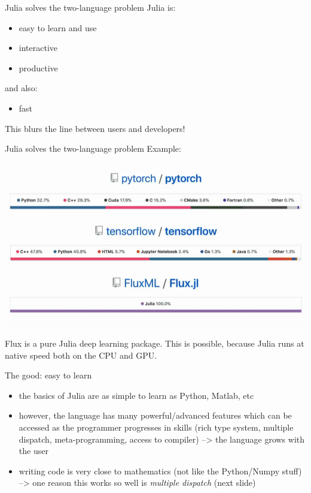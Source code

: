 \documentclass[compress,presentation,aspectratio=169]{beamer}
\begin{document}
\begin{frame}[label={sec:orgda7d66a}]{Julia solves the two-language problem}
  \footnotesize
Julia is:
\begin{itemize}
\item easy to learn and use
\item interactive
\item productive
\end{itemize}

and also:
\begin{itemize}
\item fast
\end{itemize}

\alert{This blurs the line between users and developers!}
\end{frame}

\begin{frame}[label={sec:org4c6a2e0}]{Julia solves the two-language problem}
  \footnotesize
Example:

\begin{center}
\includegraphics[width=.7\linewidth]{./figs/flux-vs-tensorflow.png}
\end{center}

Flux is a pure Julia deep learning package.   This is possible, because Julia runs at native speed
both on the CPU and GPU.
\end{frame}

\begin{frame}[fragile,label={sec:org8723e64}]{The good: easy to learn}
  \footnotesize
 \begin{itemize}
\item the basics of Julia are as simple to learn as Python, Matlab, etc

\item however, the language has many powerful/advanced features which can
be accessed as the programmer progresses in skills (rich type
system, multiple dispatch, meta-programming, access to compiler)
--> \alert{the language grows with the user}

\item writing code is very close to mathematics (not like the Python/Numpy
stuff)
--> one reason this works so well is \emph{multiple dispatch} (next slide)
\end{itemize}
\end{frame}
\end{document}
